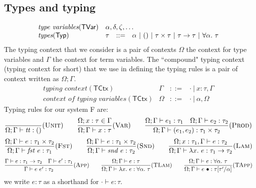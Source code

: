 \documentclass{article}
\newcommand{\gor}{~|~}
\newcommand{\fst}{\mathit{fst}}
\newcommand{\snd}{\mathit{snd}}
\newcommand{\TT}{\mathit{tt}}
\newcommand{\TYP}{\mathsf{Typ}}
\newcommand{\UNT}{()}
\newcommand{\TCTX}{\mathsf{TCtx}}
\newcommand{\TVAR}{\mathsf{TVar}}
\begin{document}
\subsection{Types and typing}
\[
\begin{array}{llll}
\textit{type variables}(\TVAR) & \multicolumn{3}{l}{\alpha, \delta, \zeta, \dots}\\
\textit{types}(\TYP) & \tau &::=& \alpha \gor \UNT \gor \tau \times\tau
\gor \tau \to \tau \gor \forall \alpha.~\tau
\end{array}
\]
The typing context that we consider is a pair of contexts $\Omega$ the context for type variables and $\Gamma$ the context for term variables.
The ``compound" typing context (typing context for short) that we use in defining the typing rules is a pair of context written as $\Omega; \Gamma$.
\[
\begin{array}{llll}
\textit{typing context}(\TCTX) & \Gamma &::=& \cdot \gor x : \tau, \Gamma\\
\textit{context of typing variables}(\TCTX) & \Omega &::=& \cdot \gor \alpha, \Omega
\end{array}
\]
Typing rules for our system F are:
\[
\frac{}{\Omega; \Gamma \vdash \TT : \UNT}(\textsc{Unit})
\hspace{2em}
\frac{\Omega; x : \tau \in \Gamma}{\Omega; \Gamma \vdash x : \tau}(\textsc{Var})
\hspace{2em}
\frac{\Omega; \Gamma \vdash e_1 : \tau_1 \hspace{1em}
\Omega; \Gamma \vdash e_2 : \tau_2}{\Omega; \Gamma \vdash (e_1, e_2) : \tau_1 \times \tau_2}(\textsc{Prod})
\]
\[
\frac{\Omega; \Gamma \vdash e : \tau_1 \times \tau_2}{\Omega; \Gamma \vdash \fst~e : \tau_1}(\textsc{Fst})
\hspace{2em}
\frac{\Omega; \Gamma \vdash e : \tau_1 \times \tau_2}{\Omega; \Gamma \vdash \snd~e : \tau_2}(\textsc{Snd})
\hspace{2em}
\frac{\Omega; x : \tau_1, \Gamma \vdash e : \tau_2}{\Omega; \Gamma \vdash \lambda x.~e : \tau_1 \to \tau_2}(\textsc{Lam})
\]
\[
\frac{\Gamma \vdash e : \tau_1 \to \tau_2 \hspace{1em}
\Gamma \vdash e' : \tau_1}{\Gamma \vdash e~e' : \tau_2}(\textsc{App})
\hspace{2em}
\frac{\Omega; \Gamma \vdash e : \tau}{\Omega; \Gamma \vdash \lambda x.~e : \forall \alpha.~\tau}(\textsc{TLam})
\hspace{2em}
\frac{\Omega; \Gamma \vdash e : \forall \alpha.~\tau}
{\Omega; \Gamma \vdash e~\bullet : \tau[\tau'/\alpha]}(\textsc{TApp})\\
\]
we write $e : \tau$ as a shorthand for $\cdot \vdash e : \tau$.
\end{document}
